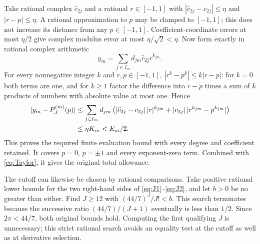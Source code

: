 \documentclass[11pt]{article}
\begin{document}
Take rational complex $\widehat c_{2j}$ and a rational
$r\in[-1,1]$ with
$|\widehat c_{2j}-c_{2j}|\le\eta$ and $|r-p|\le\eta$.
A rational approximation to $p$ may be clamped to $[-1,1]$;
this does not increase its distance from any $p\in[-1,1]$.
Coefficient-coordinate errors at most $\eta/2$ give
complex modulus error at most $\eta/\sqrt2<\eta$.
Now form exactly in rational complex arithmetic
\begin{equation}\label{eq:rationaloutput}
y_m=\sum_{j\in I_m}d_{jm}\widehat c_{2j}r^{k_{jm}}.
\end{equation}
For every nonnegative integer $k$ and $r,p\in[-1,1]$,
$|r^k-p^k|\le k|r-p|$: for $k=0$ both terms are one,
and for $k\ge1$ factor the difference into $r-p$ times
a sum of $k$ products of numbers with absolute value at
most one. Hence
\begin{align}
|y_m-P_J^{(m)}(p)|
&\le\sum_{j\in I_m}d_{jm}
\left(|\widehat c_{2j}-c_{2j}|\,|r|^{k_{jm}}
+|c_{2j}|\,|r^{k_{jm}}-p^{k_{jm}}|\right)\notag\\
&\le\eta K_m<E_m/2.\label{eq:evaluationbound}
\end{align}
This proves the required finite evaluation bound with
every degree and coefficient retained. It covers $p=0$,
$p=\pm1$ and every exponent-zero term. Combined with
\eqref{eq:Taylor}, it gives the original total allowance.

The cutoff can likewise be chosen by rational comparisons.
Take positive rational lower bounds for the two right-hand
sides of \eqref{eq:J1}--\eqref{eq:J2}, and let $b>0$ be
no greater than either. Find $J\ge12$ with
$(44/7)^J/J!<b$. This search terminates because the
successive ratio $(44/7)/(J+1)$ eventually is less than
$1/2$. Since $2\pi<44/7$, both original bounds hold.
Computing the first qualifying $J$ is unnecessary; this
strict rational search avoids an equality test at the
cutoff as well as at derivative selection.
\end{document}
